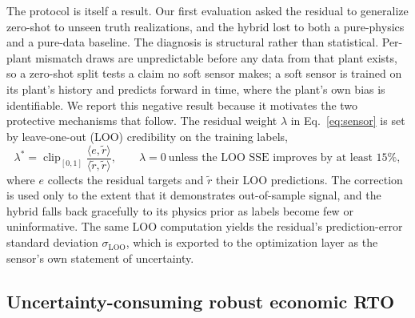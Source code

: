 \documentclass[review,number,sort&compress]{elsarticle}
\begin{document}
The protocol is itself a result. Our first evaluation asked the
residual to generalize zero-shot to unseen truth realizations, and the
hybrid lost to both a pure-physics and a pure-data baseline. The
diagnosis is structural rather than statistical. Per-plant mismatch
draws are unpredictable before any data from that plant exists, so a
zero-shot split tests a claim no soft sensor makes; a soft sensor is
trained on its plant's history and predicts forward in time, where the
plant's own bias is identifiable. We report this negative result
because it motivates the two protective mechanisms that follow. The
residual weight $\lambda$ in Eq.~\eqref{eq:sensor} is set by
leave-one-out (LOO) credibility on the training labels,
\begin{equation}\label{eq:lambda}
\lambda^{\ast} = \operatorname{clip}_{[0,1]}
\frac{\langle e, \tilde r\rangle}{\langle \tilde r, \tilde r\rangle},
\qquad \lambda = 0 \ \text{unless the LOO SSE improves by at least } 15\%,
\end{equation}
where $e$ collects the residual targets and $\tilde r$ their LOO
predictions. The correction is used only to the extent that it
demonstrates out-of-sample signal, and the hybrid falls back gracefully
to its physics prior as labels become few or uninformative. The same
LOO computation yields the residual's prediction-error standard
deviation $\sigma_{\mathrm{LOO}}$, which is exported to the
optimization layer as the sensor's own statement of uncertainty.

\subsection{Uncertainty-consuming robust economic RTO}\label{sec:rto}
\end{document}

